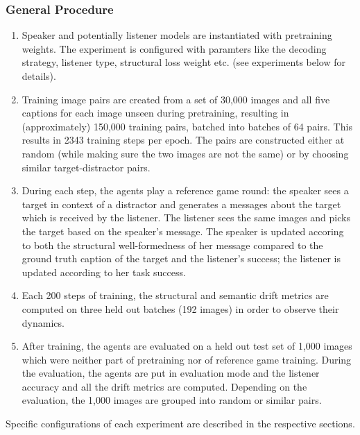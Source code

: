 \subsubsection{General Procedure}
\begin{enumerate}
	\item Speaker and potentially listener models are instantiated with pretraining weights. The experiment is configured with paramters like the decoding strategy, listener type, structural loss weight etc. (see experiments below for details).   
	\item Training image pairs are created from a set of 30,000 images and all five captions for each image unseen during pretraining, resulting in (approximately) 150,000 training pairs, batched into batches of 64 pairs. This results in 2343 training steps per epoch. The pairs are constructed either at random (while making sure the two images are not the same) or by choosing similar target-distractor pairs. 
	\item During each step, the agents play a reference game round: the speaker sees a target in context of a distractor and generates a messages about the target which is received by the listener. The listener sees the same images and picks the target based on the speaker's message. The speaker is updated accoring to both the structural well-formedness of her message compared to the ground truth caption of the target and the listener's success; the listener is updated according to her task success. 
	\item Each 200 steps of training, the structural and semantic drift metrics are computed on three held out batches (192 images) in order to observe their dynamics.
	\item After training, the agents are evaluated on a held out test set of 1,000 images which were neither part of pretraining nor of reference game training. During the evaluation, the agents are put in evaluation mode and the listener accuracy and all the drift metrics are computed. Depending on the evaluation, the 1,000 images are grouped into random or similar pairs.
\end{enumerate}
Specific configurations of each experiment are described in the respective sections. 

